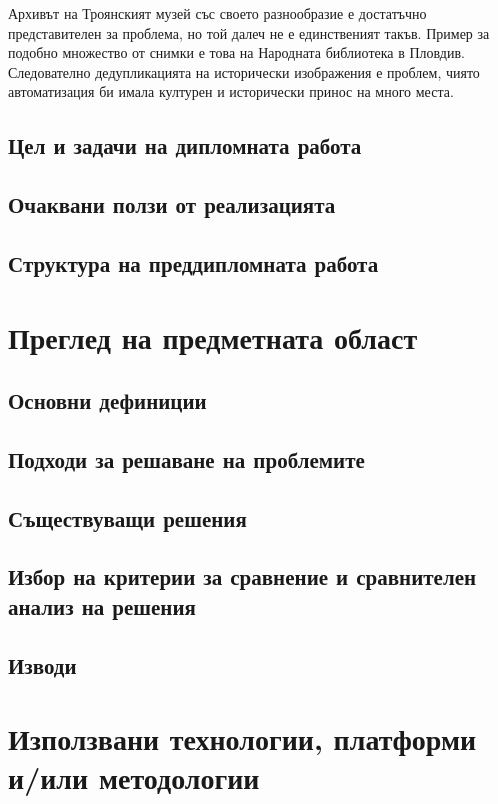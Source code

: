 \documentclass[a4paper,12pt]{article}
\begin{document}
\bigbreak

Архивът на Троянският музей със своето разнообразие е достатъчно представителен за проблема, но той далеч не е единственият такъв. Пример за подобно множество от снимки е това на Народната библиотека в Пловдив. Следователно дедупликацията на исторически изображения е проблем, чиято автоматизация би имала културен и исторически принос на много места.

\subsection{Цел и задачи на дипломната работа}
\subsection{Очаквани ползи от реализацията}
\subsection{Структура на преддипломната работа}

\section{Преглед на предметната област}

\subsection{Основни дефиниции}
\subsection{Подходи за решаване на проблемите}
\subsection{Съществуващи решения}
\subsection{Избор на критерии за сравнение и сравнителен анализ на решения}
\subsection{Изводи}

\section{Използвани технологии, платформи и/или методологии}
\end{document}
